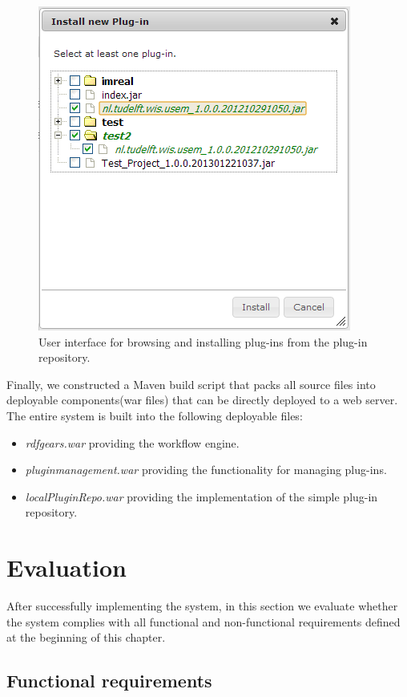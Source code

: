 \begin{figure}[h!]
  \centering
  	\includegraphics[scale=0.6]{plug-in/ui/repo.png}
  \caption{User interface for browsing and installing plug-ins from the plug-in repository.}
  \label{repo_ui}
\end{figure}

Finally, we constructed a Maven build script that packs all source files into deployable components(war files) that can be directly deployed to a web server. The entire system is built into the following deployable files:
\begin{itemize}
	\item \textit{rdfgears.war} providing the workflow engine.
	\item \textit{pluginmanagement.war} providing the functionality for managing plug-ins.
	\item \textit{localPluginRepo.war} providing the implementation of the simple plug-in repository.
\end{itemize}

\section{Evaluation}
\label{sec:eval}

After successfully implementing the system, in this section we evaluate whether the system complies with all functional and non-functional requirements defined at the beginning of this chapter. 

\subsection{Functional requirements}

